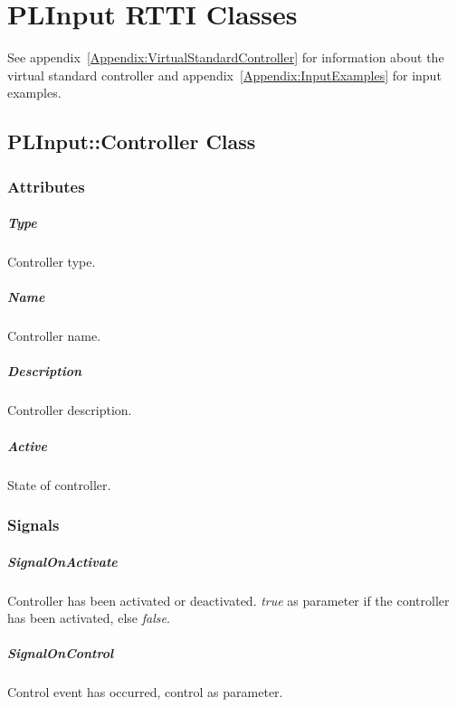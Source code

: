 \chapter{PLInput \ac{RTTI} Classes}
See appendix~\ref{Appendix:VirtualStandardController} for information about the virtual standard controller and appendix~\ref{Appendix:InputExamples} for input examples.



\section{PLInput::Controller Class}


\subsection{Attributes}

\paragraph{Type}
Controller type.

\paragraph{Name}
Controller name.

\paragraph{Description}
Controller description.

\paragraph{Active}
State of controller.


\subsection{Signals}

\paragraph{SignalOnActivate}
Controller has been activated or deactivated. \emph{true} as parameter if the controller has been activated, else \emph{false}.

\paragraph{SignalOnControl}
Control event has occurred, control as parameter.

